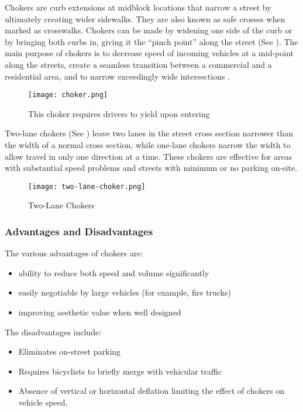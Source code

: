 Chokers are curb extensions at midblock locations that narrow a street by ultimately creating wider sidewalks. They are also known as safe crosses when marked as crosswalks. Chokers can be made by widening one side of the curb or by bringing both curbs in, giving it the “pinch point” along the street (See ). The main purpose of chokers is to decrease speed of incoming vehicles at a mid-point along the streets, create a seamless transition between a commercial and a residential area, and to narrow exceedingly wide intersections \cite{walking-info-chokers}.

\begin{figure}[h]
\centering
\texttt{[image: choker.png]}
\caption[Choker]{This choker requires drivers to yield upon entering}\label{fig:choker}
\end{figure}

Two-lane chokers (See ) leave two lanes in the street cross section narrower than the width of a normal cross section, while one-lane chokers narrow the width to allow travel in only one direction at a time. These chokers are effective for areas with substantial speed problems and streets with minimum or no parking on-site.

\begin{figure}
\centering
\texttt{[image: two-lane-choker.png]}
\caption{Two-Lane Chokers}\label{fig:two-lane-choker}
\end{figure}

\subsubsection{Advantages and Disadvantages}

The various advantages of chokers are:\begin{itemize}
\item ability to reduce both speed and volume significantly
\item easily negotiable by large vehicles (for example, fire trucks)
\item improving aesthetic value when well designed
\end{itemize}

The disadvantages include:\begin{itemize}
\item Eliminates on-street parking
\item Requires bicyclists to briefly merge with vehicular traffic
\item Absence of vertical or horizontal deflation limiting the effect of chokers on vehicle speed.
\end{itemize}

